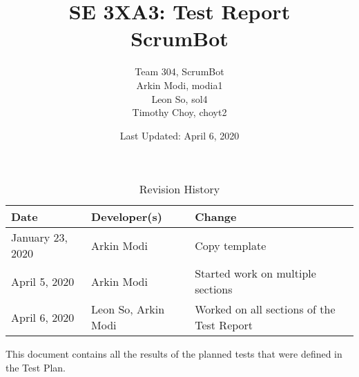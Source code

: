 \documentclass[12pt, titlepage]{article}
\title{SE 3XA3: Test Report\\ScrumBot}
\author{
    Team 304, ScrumBot
        \\ Arkin Modi, modia1
        \\ Leon So, sol4
        \\ Timothy Choy, choyt2
}
\date{Last Updated: April 6, 2020}
\begin{document}
\maketitle

\tableofcontents
\listoftables
\listoffigures

\begin{table}[H]
    \caption{Revision History} \label{TblRevisionHistory}
    \begin{tabularx}{\textwidth}{llX}
        \toprule
            \textbf{Date} & \textbf{Developer(s)} & \textbf{Change}\\
        \midrule
            January 23, 2020 & Arkin Modi & Copy template\\
            April 5, 2020 & Arkin Modi & Started work on multiple sections\\
            April 6, 2020 & Leon So, Arkin Modi & Worked on all sections of the Test Report\\
        \bottomrule
    \end{tabularx}
\end{table}

\newpage


This document contains all the results of the planned tests that were defined in the Test Plan.
\end{document}
